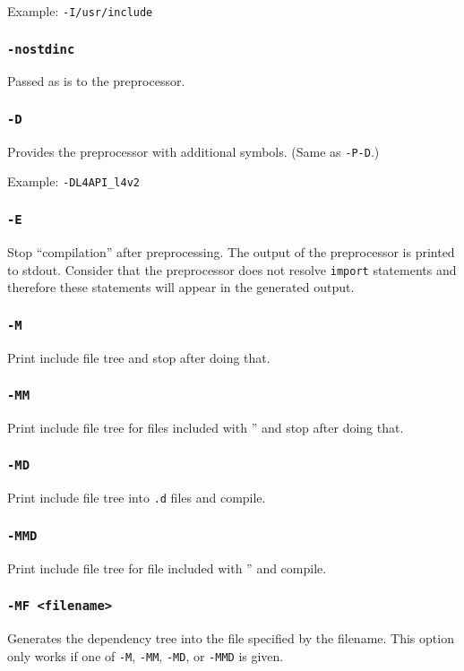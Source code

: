 Example: \verb|-I/usr/include|

\subsubsection{{\tt -nostdinc}}
Passed as is to the preprocessor.

\subsubsection{{\tt -D}}
Provides the preprocessor with additional symbols. (Same as
{\tt -P-D}.)

Example: \verb|-DL4API_l4v2|

\subsubsection{{\tt -E}}
Stop ``compilation'' after preprocessing. The output of the
preprocessor is printed to stdout. Consider that the preprocessor
does not resolve \verb|import| statements and therefore these
statements will appear in the generated output.

\subsubsection{{\tt -M}}
Print include file tree and stop after doing that.

\subsubsection{{\tt -MM}}
Print include file tree for files included with '' and stop
after doing that.

\subsubsection{{\tt -MD}}
Print include file tree into \verb|.d| files and compile.

\subsubsection{{\tt -MMD}}
Print include file tree for file included with '' and compile.

\subsubsection{{\tt -MF <filename>}}
Generates the dependency tree into the file specified by the filename. This
option only works if one of {\tt -M}, {\tt -MM}, {\tt -MD}, or {\tt -MMD} is
given.

